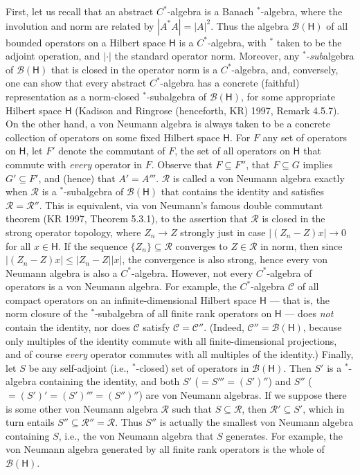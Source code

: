 \documentclass[12pt]{article}
\newcommand{\alg}[1]{\mbox{$\mathcal{#1}$}}
\newcommand{\hil}[1]{\mbox{$\mathsf{#1}$}}
\begin{document}
 First, let us recall that an abstract
$C^{*}$-algebra is a Banach $^{*}$-algebra, where the 
involution and norm are related by $|A^{*}A|=|A|^{2}$.  Thus 
the algebra $\alg{B}(\hil{H})$ of all bounded operators on a Hilbert space 
$\hil{H}$ is a $C^{*}$-algebra, with $^{*}$ taken to be 
the adjoint operation, and $|\cdot|$ the 
standard operator norm.  
Moreover, any $^{*}$-\emph{sub}algebra of $\alg{B}(\hil{H})$ 
that is closed in the operator norm is a $C^{*}$-algebra, and, 
conversely, one can show that every abstract $C^{*}$-algebra has a concrete 
(faithful) representation as a norm-closed $^{*}$-subalgebra of 
$\alg{B}(\hil{H})$, for some appropriate Hilbert space $\hil{H}$ 
(Kadison and Ringrose (henceforth, KR) 1997, Remark 4.5.7). 
On 
the other hand, a   
von Neumann algebra is always taken to be a concrete collection 
of operators on some fixed Hilbert space $\hil{H}$.  For $F$ any 
set of operators on $\hil{H}$, let $F'$ denote the 
commutant of $F$, the set of all operators on 
$\hil{H}$ that commute 
with \emph{every} operator in $F$.  Observe that $F\subseteq F''$, 
that $F\subseteq G$ implies $G'\subseteq F'$, and (hence) that $A'=A'''$.  $\alg{R}$ is called a 
von Neumann algebra exactly when $\alg{R}$ is a      
$^{*}$-subalgebra of $\alg{B}(\hil{H})$ that contains the identity and 
satisfies $\alg{R}=\alg{R}''$.  This is equivalent, via von Neumann's 
famous double 
commutant theorem (KR 1997, Theorem 5.3.1), to the assertion that $\alg{R}$ is closed 
in the strong operator topology, where $Z_{n}\rightarrow Z$ strongly just in 
case $|(Z_{n}-Z)x|\rightarrow 0$ for all $x\in\hil{H}$.  If the 
sequence $\{Z_{n}\}\subseteq\alg{R}$ converges to $Z\in\alg{R}$ in 
norm, then since 
$|(Z_{n}-Z)x|\leq |Z_{n}-Z||x|$, the convergence is also strong, hence
every von 
Neumann algebra is also a 
$C^{*}$-algebra.   However, not every $C^{*}$-algebra of operators is a von Neumann algebra.  
For example, the $C^{*}$-algebra $\alg{C}$ of all compact operators on 
an infinite-dimensional Hilbert space $\hil{H}$ --- 
that is, the norm closure of the $^{*}$-subalgebra of all finite 
rank operators on $\hil{H}$ --- does 
\emph{not} contain the identity, nor does $\alg{C}$ satisfy $\alg{C}=\alg{C}''$.  
(Indeed, $\alg{C}''=\alg{B}(\hil{H})$, because only
 multiples of the identity commute with all finite-dimensional 
projections, and of course 
\emph{every} operator commutes with all multiples of the 
identity.)
Finally, let $S$ be any self-adjoint (i.e., $^{*}$-closed) set of 
operators in $\alg{B}(\hil{H})$.  Then $S'$ 
is a $^{*}$-algebra containing the identity, and both $S'$ 
($=S'''=(S')''$) and $S''$ 
($=(S')'=(S')'''=(S'')''$)  
are von Neumann algebras.  If we suppose there is some other von 
Neumann algebra $\alg{R}$ such that $S\subseteq \alg{R}$, then 
$\alg{R}'\subseteq S'$, which in turn entails 
 $S''\subseteq \alg{R}''=\alg{R}$.  Thus 
$S''$ is actually the smallest von Neumann algebra containing 
$S$, i.e., the von Neumann algebra that $S$ generates.  
For example, the von Neumann algebra generated by all finite rank 
operators is the whole of $\alg{B}(\hil{H})$.  
 
\end{document}
